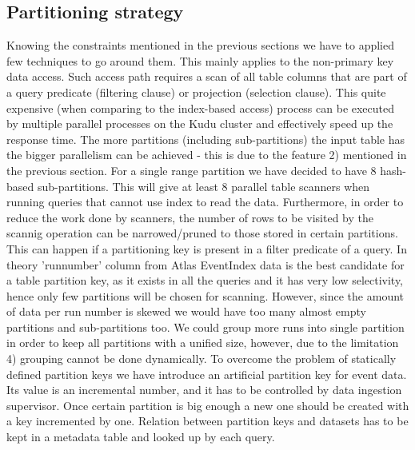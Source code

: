 \documentclass{webofc}
\begin{document}
\subsection{Partitioning strategy}
\label{sec-5-part}
Knowing the constraints mentioned in the previous sections we have to applied few techniques to go around them. \newline
This mainly applies to the non-primary key data access. Such access path requires a scan of all table columns that are part of a query predicate (filtering clause) or projection (selection clause). This quite expensive  (when comparing to the index-based access) process can be executed by multiple parallel processes on the Kudu cluster and effectively speed up the response time. The more partitions (including sub-partitions) the input table has the bigger parallelism can be achieved - this is due to the feature 2) mentioned in the previous section. For a single range partition we have decided to have 8 hash-based sub-partitions. This will give at least 8 parallel table scanners when running queries that cannot use index to read the data. \newline    
Furthermore, in order to reduce the work done by scanners, the number of rows to be visited by the scannig operation can be narrowed/pruned to those stored in certain partitions. This can happen if a partitioning key is present in a filter predicate of a query. In theory 'runnumber' column from Atlas EventIndex data is the best candidate for a table partition key, as it exists in all the queries and it has very low selectivity, hence only few partitions will be chosen for scanning. However, since the amount of data per run number is skewed we would have too many almost empty partitions and sub-partitions too. We could group more runs into single partition in order to keep all partitions with a unified size, however, due to the limitation 4) grouping cannot be done dynamically. To overcome the problem of statically defined partition keys we have introduce an artificial partition key for event data. Its value is an incremental number, and it has to be controlled by data ingestion supervisor. Once certain partition is big enough a new one should be created with a key incremented by one. Relation between partition keys and datasets has to be kept in a metadata table and looked up by each query. 
\end{document}
